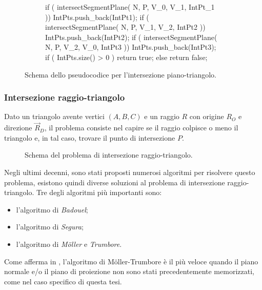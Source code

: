\begin{figure}[htbp]
	\centering
	\begin{subfigure}{.8\linewidth}
	\begin{pseudoc}
	if ( intersectSegmentPlane( N, P, V_0, V_1, IntPt_1 ))
	{ IntPts.push_back(IntPt1); }
	if ( intersectSegmentPlane( N, P, V_1, V_2, IntPt2 ))
	{ IntPts.push_back(IntPt2); }
	if ( intersectSegmentPlane( N, P, V_2, V_0, IntPt3 ))
	{ IntPts.push_back(IntPt3); }
	if ( IntPts.size() > 0 ) 
	{ return true; }
	else 
	{ return false; }
	\end{pseudoc}
	\end{subfigure}
	\caption{Schema dello pseudocodice per l'intersezione piano-triangolo.}
\end{figure}
%
\subsubsection{Intersezione raggio-triangolo}
Dato un triangolo avente vertici $(A,B,C)$ e un raggio $R$ con origine $R_O$ e direzione $\vec{R}_D$, il problema consiste nel capire se il raggio colpisce o meno il triangolo e, in tal caso, trovare il punto di intersezione $P$.
%
\begin{figure}[htbp]
	\centering
	\caption{Schema del problema di intersezione raggio-triangolo.}
\end{figure}
%
Negli ultimi decenni, sono stati proposti numerosi algoritmi per risolvere questo problema, esistono quindi diverse soluzioni al problema di intersezione raggio-triangolo. Tre degli algoritmi più importanti sono:
\begin{itemize}
	\item l'algoritmo di \textit{Badouel};
	\item l'algoritmo di \textit{Segura};
	\item l'algoritmo di \textit{M\"oller} e \textit{Trumbore}.
\end{itemize}
\noindent
Come \citeauthor{RayTriangle} afferma in \cite{RayTriangle}, l'algoritmo di M\"oller-Trumbore è il più veloce quando il piano normale e/o il piano di proiezione non sono stati precedentemente memorizzati, come nel caso specifico di questa tesi.

